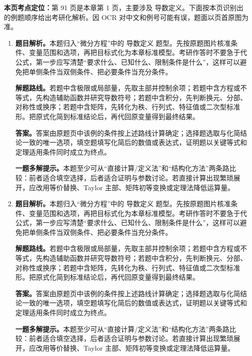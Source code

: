 \begin{solutionblock}
\textbf{本页考点定位：}第 91 页是本章第 1 页，主要涉及 导数定义。下面按本页识别出的例题顺序给出考研化解析。因 OCR 对中文和例号可能有误，题面以页首原图为准。

\begin{enumerate}[label=\textbf{例\arabic*.}, leftmargin=2.4em]

\item \textbf{题目解析。}本题归入“微分方程”中的 导数定义 题型。先按原题图片核准条件、变量范围和选项，再把目标式化为本章标准模型。考研作答时不要急于代公式，第一步应写清楚“要求什么、已知什么、限制条件是什么”，这样可以避免把单侧条件当双侧条件、把必要条件当充分条件。

\textbf{解题路线。}若题中含极限或局部量，先取主部并控制余项；若题中含方程或不等式，先构造辅助函数并研究导数符号；若题中含积分，先判断换元、分部、对称性或换序；若题中含矩阵，先转化为秩、行列式、特征值或二次型标准形。把原式化简到标准结论后，再代回原变量得到最终结果。

\textbf{答案。}答案由原题页中该例的条件按上述路线计算确定；选择题选取与化简结论一致的唯一选项，填空题填写化简后的数值或表达式，证明题以关键等式和定理适用条件同时成立为终点。

\textbf{一题多解提示。}本题至少可从“直接计算/定义法”和“结构化方法”两条路比较：前者适合填空选择，后者适合证明与参数讨论。若直接计算出现繁琐展开，应改用等价替换、Taylor 主部、矩阵初等变换或定理法降低运算量。

\item \textbf{题目解析。}本题归入“微分方程”中的 导数定义 题型。先按原题图片核准条件、变量范围和选项，再把目标式化为本章标准模型。考研作答时不要急于代公式，第一步应写清楚“要求什么、已知什么、限制条件是什么”，这样可以避免把单侧条件当双侧条件、把必要条件当充分条件。

\textbf{解题路线。}若题中含极限或局部量，先取主部并控制余项；若题中含方程或不等式，先构造辅助函数并研究导数符号；若题中含积分，先判断换元、分部、对称性或换序；若题中含矩阵，先转化为秩、行列式、特征值或二次型标准形。把原式化简到标准结论后，再代回原变量得到最终结果。

\textbf{答案。}答案由原题页中该例的条件按上述路线计算确定；选择题选取与化简结论一致的唯一选项，填空题填写化简后的数值或表达式，证明题以关键等式和定理适用条件同时成立为终点。

\textbf{一题多解提示。}本题至少可从“直接计算/定义法”和“结构化方法”两条路比较：前者适合填空选择，后者适合证明与参数讨论。若直接计算出现繁琐展开，应改用等价替换、Taylor 主部、矩阵初等变换或定理法降低运算量。


\end{enumerate}
\end{solutionblock}
